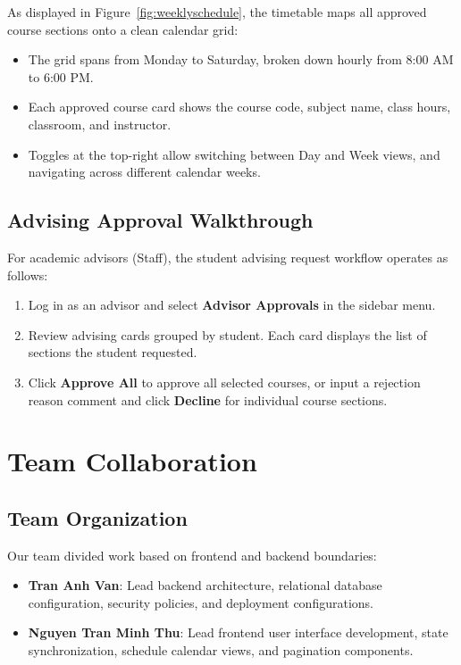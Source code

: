 \documentclass[12pt,a4paper]{report}
\begin{document}
As displayed in Figure~\ref{fig:weeklyschedule}, the timetable maps all approved course sections onto a clean calendar grid:
\begin{itemize}
    \item The grid spans from Monday to Saturday, broken down hourly from 8:00 AM to 6:00 PM.
    \item Each approved course card shows the course code, subject name, class hours, classroom, and instructor.
    \item Toggles at the top-right allow switching between Day and Week views, and navigating across different calendar weeks.
\end{itemize}

\section{Advising Approval Walkthrough}
For academic advisors (Staff), the student advising request workflow operates as follows:
\begin{enumerate}
    \item Log in as an advisor and select \textbf{Advisor Approvals} in the sidebar menu.
    \item Review advising cards grouped by student. Each card displays the list of sections the student requested.
    \item Click \textbf{Approve All} to approve all selected courses, or input a rejection reason comment and click \textbf{Decline} for individual course sections.
\end{enumerate}

\chapter{Team Collaboration}
\section{Team Organization}
Our team divided work based on frontend and backend boundaries:
\begin{itemize}
    \item \textbf{Tran Anh Van}: Lead backend architecture, relational database configuration, security policies, and deployment configurations.
    \item \textbf{Nguyen Tran Minh Thu}: Lead frontend user interface development, state synchronization, schedule calendar views, and pagination components.
\end{itemize}
\end{document}
